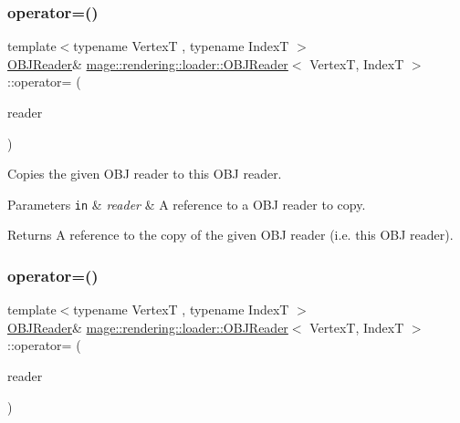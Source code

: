 \subsubsection{\texorpdfstring{operator=()}{operator=()}\hspace{0.1cm}{\footnotesize\ttfamily [1/2]}}
{\footnotesize\ttfamily template$<$typename VertexT , typename IndexT $>$ \\
\mbox{\hyperlink{classmage_1_1rendering_1_1loader_1_1_o_b_j_reader}{O\+B\+J\+Reader}}\& \mbox{\hyperlink{classmage_1_1rendering_1_1loader_1_1_o_b_j_reader}{mage\+::rendering\+::loader\+::\+O\+B\+J\+Reader}}$<$ VertexT, IndexT $>$\+::operator= (\begin{DoxyParamCaption}\item[{const \mbox{\hyperlink{classmage_1_1rendering_1_1loader_1_1_o_b_j_reader}{O\+B\+J\+Reader}}$<$ VertexT, IndexT $>$ \&}]{reader }\end{DoxyParamCaption})\hspace{0.3cm}{\ttfamily [delete]}}

Copies the given O\+BJ reader to this O\+BJ reader.


\begin{DoxyParams}[1]{Parameters}
\mbox{\tt in}  & {\em reader} & A reference to a O\+BJ reader to copy. \\
\hline
\end{DoxyParams}
\begin{DoxyReturn}{Returns}
A reference to the copy of the given O\+BJ reader (i.\+e. this O\+BJ reader). 
\end{DoxyReturn}
\mbox{\label{classmage_1_1rendering_1_1loader_1_1_o_b_j_reader_ad35fe46e20179ce1cd79386501ee0959}} 
\subsubsection{\texorpdfstring{operator=()}{operator=()}\hspace{0.1cm}{\footnotesize\ttfamily [2/2]}}
{\footnotesize\ttfamily template$<$typename VertexT , typename IndexT $>$ \\
\mbox{\hyperlink{classmage_1_1rendering_1_1loader_1_1_o_b_j_reader}{O\+B\+J\+Reader}}\& \mbox{\hyperlink{classmage_1_1rendering_1_1loader_1_1_o_b_j_reader}{mage\+::rendering\+::loader\+::\+O\+B\+J\+Reader}}$<$ VertexT, IndexT $>$\+::operator= (\begin{DoxyParamCaption}\item[{\mbox{\hyperlink{classmage_1_1rendering_1_1loader_1_1_o_b_j_reader}{O\+B\+J\+Reader}}$<$ VertexT, IndexT $>$ \&\&}]{reader }\end{DoxyParamCaption})\hspace{0.3cm}{\ttfamily [delete]}}

